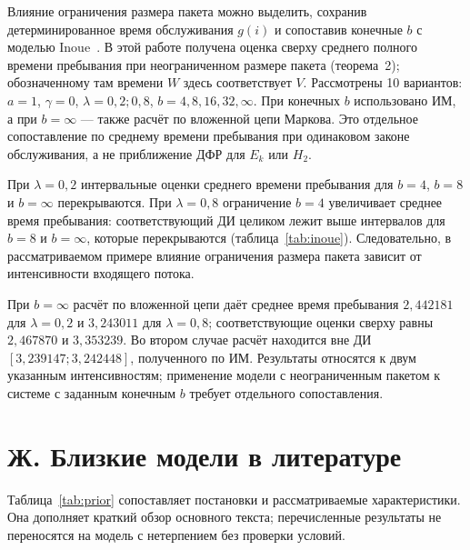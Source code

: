 Влияние ограничения размера пакета можно выделить, сохранив детерминированное время обслуживания $g(i)$ и сопоставив конечные $b$ с моделью Inoue~\cite{inoue2021}. В этой работе получена оценка сверху среднего полного времени пребывания при неограниченном размере пакета (теорема~2); обозначенному там времени $W$ здесь соответствует $V$. Рассмотрены 10 вариантов: $a=1$, $\gamma=0$, $\lambda=0{,}2;0{,}8$, $b=4,8,16,32,\infty$. При конечных $b$ использовано ИМ, а при $b=\infty$ --- также расчёт по вложенной цепи Маркова. Это отдельное сопоставление по среднему времени пребывания при одинаковом законе обслуживания, а не приближение ДФР для $E_k$ или $H_2$.

\begin{table}[htbp]\centering\small
\caption{Среднее время пребывания при детерминированном обслуживании $g(i)$, $a=1$, $\gamma=0$: ИМ, расчёт по вложенной цепи и оценка сверху}\label{tab:inoue}

\end{table}

При $\lambda=0{,}2$ интервальные оценки среднего времени пребывания для $b=4$, $b=8$ и $b=\infty$ перекрываются. При $\lambda=0{,}8$ ограничение $b=4$ увеличивает среднее время пребывания: соответствующий ДИ целиком лежит выше интервалов для $b=8$ и $b=\infty$, которые перекрываются (таблица~\ref{tab:inoue}). Следовательно, в рассматриваемом примере влияние ограничения размера пакета зависит от интенсивности входящего потока.

При $b=\infty$ расчёт по вложенной цепи даёт среднее время пребывания $2{,}442181$ для $\lambda=0{,}2$ и $3{,}243011$ для $\lambda=0{,}8$; соответствующие оценки сверху равны $2{,}467870$ и $3{,}353239$. Во втором случае расчёт находится вне ДИ $[3{,}239147;3{,}242448]$, полученного по ИМ. Результаты относятся к двум указанным интенсивностям; применение модели с неограниченным пакетом к системе с заданным конечным $b$ требует отдельного сопоставления.

\section*{Ж. Близкие модели в литературе}

Таблица~\ref{tab:prior} сопоставляет постановки и рассматриваемые характеристики. Она дополняет краткий обзор основного текста; перечисленные результаты не переносятся на модель с нетерпением без проверки условий.

